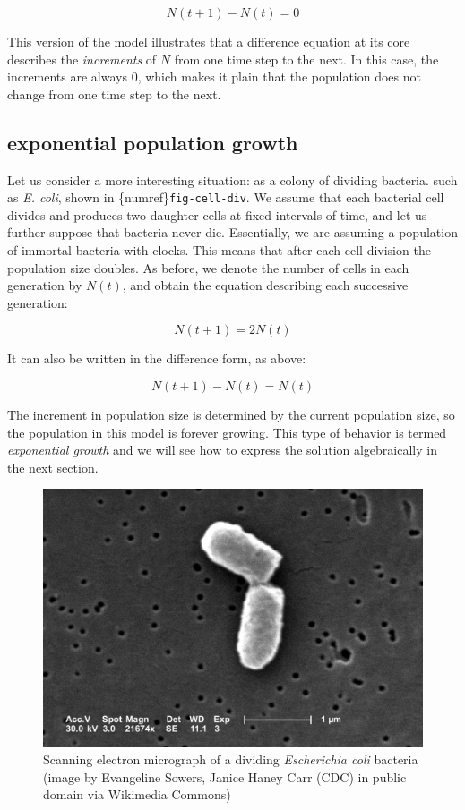 \documentclass[
  letterpaper,
  DIV=11,
  numbers=noendperiod]{scrreprt}
\begin{document}
\[
N(t+1) - N(t) = 0
\]

This version of the model illustrates that a difference equation at its
core describes the \emph{increments} of \(N\) from one time step to the
next. In this case, the increments are always 0, which makes it plain
that the population does not change from one time step to the next.

\hypertarget{exponential-population-growth}{%
\subsection{exponential population
growth}\label{exponential-population-growth}}

Let us consider a more interesting situation: as a colony of dividing
bacteria. such as \emph{E. coli}, shown in
\{numref\}\texttt{fig-cell-div}. We assume that each bacterial cell
divides and produces two daughter cells at fixed intervals of time, and
let us further suppose that bacteria never die. Essentially, we are
assuming a population of immortal bacteria with clocks. This means that
after each cell division the population size doubles. As before, we
denote the number of cells in each generation by \(N(t)\), and obtain
the equation describing each successive generation:

\[
N(t+1) = 2N(t)
\]

It can also be written in the difference form, as above:

\[
N(t+1) - N(t) = N(t)
\]

The increment in population size is determined by the current population
size, so the population in this model is forever growing. This type of
behavior is termed \emph{exponential growth} and we will see how to
express the solution algebraically in the next section.

\begin{figure}

\includegraphics{./images/Ecoli_dividing.png} \hfill{}

\caption{Scanning electron micrograph of a dividing \emph{Escherichia
coli} bacteria (image by Evangeline Sowers, Janice Haney Carr (CDC) in
public domain via Wikimedia Commons)}

\end{figure}
\end{document}
